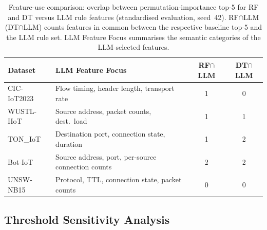 \begin{table}[htbp]
\centering
\caption{Feature-use comparison: overlap between permutation-importance top-5 for RF and DT versus LLM rule features (standardised evaluation, seed~42). RF$\cap$LLM (DT$\cap$LLM) counts features in common between the respective baseline top-5 and the LLM rule set. LLM Feature Focus summarises the semantic categories of the LLM-selected features.}
\label{tab:feature_use_current}
\begin{tabularx}{\columnwidth}{lXcc}
\toprule
\textbf{Dataset} &
\textbf{LLM Feature Focus} &
\textbf{RF$\cap$LLM} &
\textbf{DT$\cap$LLM} \\
\midrule
CIC-IoT2023 & Flow timing, header length, transport rate & 1 & 0 \\
WUSTL-IIoT  & Source address, packet counts, dest.\ load & 1 & 1 \\
TON\_IoT    & Destination port, connection state, duration & 1 & 2 \\
Bot-IoT     & Source address, port, per-source connection counts & 2 & 2 \\
UNSW-NB15   & Protocol, TTL, connection state, packet counts & 0 & 0 \\
\bottomrule
\end{tabularx}
\end{table}


\subsection{Threshold Sensitivity Analysis}
\label{subsec:threshold}

